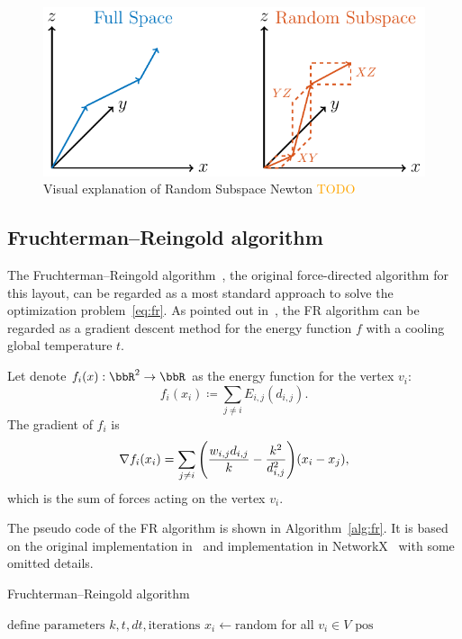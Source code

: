 \documentclass[dvipdfmx,journal]{IEEEtran}
\newcommand{\orange}[1]{\textcolor{orange}{#1}}
\newcommand{\defeq}{\coloneqq}
\begin{document}
\begin{figure}[t]
  \begin{minipage}{0.49\hsize}
    \centering
    \includegraphics[width=\columnwidth]{randomSubspace.pdf}
    \caption{
      Visual explanation of Random Subspace Newton
      \orange{TODO}
    }
  \end{minipage}
\end{figure}

\subsection{Fruchterman--Reingold algorithm}\label{ssec:frAlgorithm}

The Fruchterman--Reingold algorithm~\cite{fruchtermanGraphDrawingForcedirected1991}, the original force-directed algorithm for this layout, can be regarded as a most standard approach to solve the optimization problem~\eqref{eq:fr}.
As pointed out in~\cite{tunkelang1999numerical}, the FR algorithm can be regarded as a gradient descent method for the energy function $f$ with a cooling global temperature $t$.

Let denote $f_i(x): \bbR^2 \to \bbR$ as the energy function for the vertex $v_i$:
\begin{equation*}
  f_i(x_i) \defeq \sum_{j \neq i} E_{i,j}(d_{i,j}).
\end{equation*}
The gradient of $f_i$ is
\begin{equation}\label{eq:gradientFi}
  \nabla f_i(x_i) = \sum_{j \neq i} \qty(\frac{w_{i,j}d_{i,j}}{k} - \frac{k^2}{d_{i,j}^2}) (x_i-x_j),
\end{equation}
which is the sum of forces acting on the vertex $v_i$.

The pseudo code of the FR algorithm is shown in Algorithm~\ref{alg:fr}. It is based on the original implementation in~\cite{fruchtermanGraphDrawingForcedirected1991} and implementation in NetworkX~\cite{osti_960616} with some omitted details.

\begin{algorithm}[ht]
  \caption{Fruchterman--Reingold algorithm}
  \label{alg:fr}

  $\text{define parameters } k, t, dt, \text{iterations}$\;
  $x_i \gets \text{random}$ for all $v_i \in V$\;
  \Return $\text{pos}$
\end{algorithm}
\end{document}
